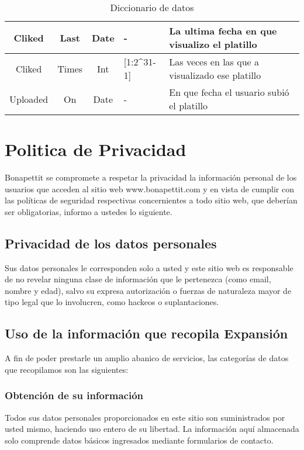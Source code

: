 \begin{landscape}
\begin{table}
\begin{center}
\begin{tabular}{| c | c | c | p{3cm} | p{12cm}|}
        \midrule
        Cliked & Last  & Date & -  & La ultima fecha en que visualizo el platillo \\
        \midrule
        Cliked & Times  & Int & [1:2\^{ }31-1]  & Las veces en las que a visualizado ese platillo \\
        \midrule
        Uploaded & On  & Date & - & En que fecha el usuario subió el platillo \\
        \bottomrule
      \end{tabular}
      \caption{Diccionario de datos}
      \label{Diccionario de datos}
    \end{center}
  \end{table}
\end{landscape}  
\newpage
\chapter{Politica de Privacidad}
Bonapettit se compromete a respetar la privacidad la información personal de los
usuarios que acceden al sitio web www.bonapettit.com y en vista de cumplir con las
políticas de seguridad respectivas concernientes a todo sitio web, que deberían ser obligatorias, informo a ustedes lo siguiente.  

\section{Privacidad de los datos personales}
Sus datos personales le corresponden solo a usted y este sitio web es responsable de no revelar ninguna clase de información que le pertenezca (como email, nombre y edad), salvo su expresa autorización o fuerzas de naturaleza mayor de tipo legal que lo involucren, como hackeos o suplantaciones.

\section{Uso de la información que recopila Expansión}
A fin de poder prestarle un amplio abanico de servicios, las categorías de datos que recopilamos son las siguientes:

\subsection{Obtención de su información}
Todos sus datos personales proporcionados en este sitio son suministrados por usted mismo, haciendo uso entero de su libertad. La información aquí almacenada solo comprende datos básicos ingresados mediante formularios de contacto.
\newpage
